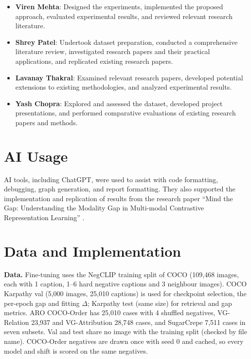 \documentclass{article}
\begin{document}
\begin{itemize}
\item \textbf{Viren Mehta}: Designed the experiments, implemented the proposed approach, evaluated experimental results, and reviewed relevant research literature.
\item \textbf{Shrey Patel}: Undertook dataset preparation, conducted a comprehensive literature review, investigated research papers and their practical applications, and replicated existing research papers.
\item \textbf{Lavanay Thakral}: Examined relevant research papers, developed potential extensions to existing methodologies, and analyzed experimental results.
\item \textbf{Yash Chopra}: Explored and assessed the dataset, developed project presentations, and performed comparative evaluations of existing research papers and methods.
\end{itemize}

\section*{AI Usage}

AI tools, including ChatGPT, were used to assist with code formatting, debugging, graph generation, and report formatting. They also supported the implementation and replication of results from the research paper ``Mind the Gap: Understanding the Modality Gap in Multi-modal Contrastive Representation Learning'' \citep{liang2022gap}.


\clearpage
\appendix

\section{Data and Implementation}
\label{app:data}\label{app:impl}

\textbf{Data.} Fine-tuning uses the NegCLIP training split of COCO \citep{lin2014coco} (109,468 images, each with 1 caption, 1--6 hard negative captions and 3 neighbour images). COCO Karpathy val (5,000 images, 25,010 captions) is used for checkpoint selection, the per-epoch gap and fitting $\Delta$; Karpathy test (same size) for retrieval and gap metrics. ARO COCO-Order has 25,010 cases with 4 shuffled negatives, VG-Relation 23,937 and VG-Attribution 28,748 cases, and SugarCrepe 7,511 cases in seven subsets. Val and test share no image with the training split (checked by file name). COCO-Order negatives are drawn once with seed 0 and cached, so every model and shift is scored on the same negatives.
\end{document}
